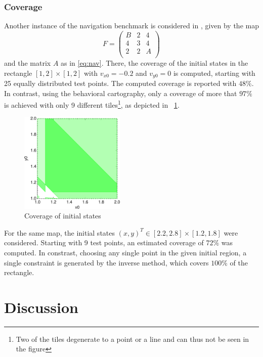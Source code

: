 \documentclass{llncs}
\begin{document}
\subsubsection{Coverage}
Another instance of the navigation benchmark is considered in
\cite{JFG+:2007}, given by the map
\begin{equation}
  F = \left(
  \begin{matrix}
    B & 2 & 4 \\
    4 & 3 & 4 \\
    2 & 2 & A \\
  \end{matrix}
  \right)
\end{equation}
and the matrix $A$ as in \eqref{eq:nav}. There, the coverage of the
initial states in the rectangle $[1,2] \times [1,2]$ with $v_{x0} =
-0.2$ and $v_{y0} = 0$ is computed, starting with 25 equally
distributed test points. The computed coverage is reported with $48
\%$. In contrast, using the behavioral cartography, only a coverage of
more that $97 \%$ is achieved with only 9 different tiles\footnote{Two
  of the tiles degenerate to a point or a line and can thus not be
  seen in the figure}, as depicted in \figurename~\ref{fig:navcart2}.

\begin{figure}[tb]
  \centering
  \includegraphics[width=5cm]{images/navigation_cart2.pdf}
  \caption{Coverage of initial states}
  \label{fig:navcart2}    
\end{figure}

For the same map, the initial states $(x,y)^T \in [2.2,2.8] \times
[1.2,1.8]$ were considered. Starting with 9 test points, an estimated
coverage of $72 \%$ was computed. In constrast, choosing any single
point in the given initial region, a single constraint is generated by
the inverse method, which covers $100 \%$ of the rectangle. 


\section{Discussion}\label{sec:disc}
\end{document}
